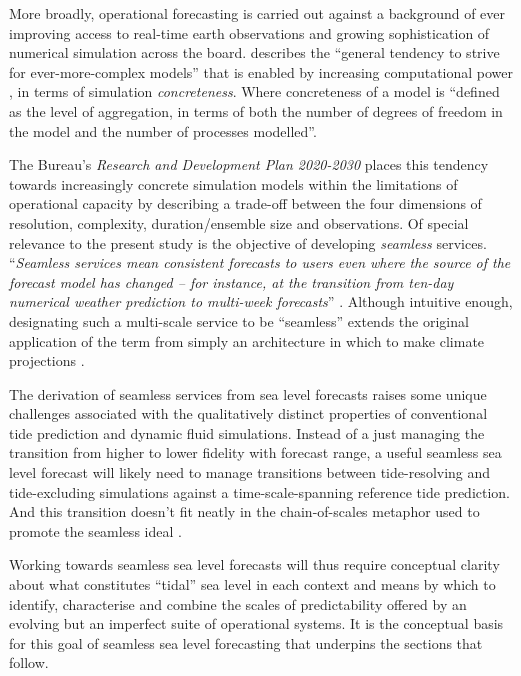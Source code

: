 More broadly, operational forecasting is carried out against a background of ever improving access to real-time earth observations and growing sophistication of numerical simulation across the board.
\citet{Petersen:2012tr} describes the ``general tendency to strive for ever-more-complex models'' that is enabled by increasing computational power , in terms of simulation \emph{concreteness}. Where concreteness of a model is ``defined as the level of aggregation, in terms of both the number of degrees of freedom in the model and the number of processes modelled''.

The Bureau's \textit{Research and Development Plan 2020-2030} places this tendency towards increasingly concrete simulation models within the limitations of operational capacity by describing a trade-off between the four dimensions of resolution, complexity, duration/ensemble size and observations. 
Of special relevance to the present study is the objective of developing \emph{seamless} services.  ``\textit{Seamless services mean consistent forecasts to users even where the source of the forecast model has changed – for instance, at the transition from ten-day numerical weather prediction to multi-week forecasts}'' \citep{BOM2020}.
Although intuitive enough, designating such a multi-scale service to be ``seamless'' extends the original application of the term from simply an architecture in which to make climate projections \cite{10.1175/bams-87-9-1195}.   


The derivation of seamless services from sea level forecasts raises some unique challenges associated with the qualitatively distinct properties of conventional tide prediction and dynamic fluid simulations.   
Instead of a just managing the transition from higher to lower fidelity with forecast range, a useful seamless sea level forecast will likely need to manage transitions between tide-resolving and tide-excluding simulations against a time-scale-spanning reference tide prediction.  And this transition doesn't fit neatly in the chain-of-scales metaphor used to promote the seamless ideal \cite{10.1175/bams-87-9-1195}.



Working towards seamless sea level forecasts will thus require conceptual clarity about what constitutes ``tidal'' sea level in each context and means by which to identify, characterise and combine the scales of predictability offered by an evolving but an imperfect suite of operational systems.  
It is the conceptual basis for this goal of seamless sea level forecasting that underpins the sections that follow.
